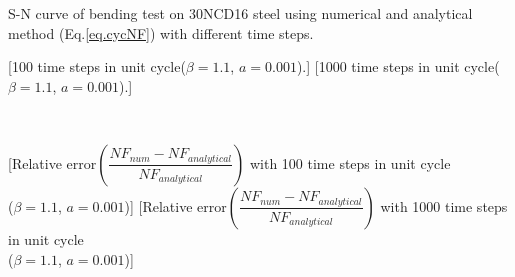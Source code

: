 \documentclass[3p,times,number,review]{elsarticle}
\begin{document}
\begin{Figure}[]{S-N curve of bending test on 30NCD16 steel using numerical and analytical method (Eq.\eqref{eq.cycNF}) with different time steps.}
	\centerline{
		[100 time steps in unit cycle($\beta=1.1$, $a=0.001$).]
		[1000 time steps in unit cycle($\beta=1.1$, $a=0.001$).]}
	\\
	\centerline{
		[Relative error$\left( \dfrac{NF_{num}-NF_{analytical}}{NF_{analytical}}\right)$  with 100 time steps in unit cycle\\  ($\beta=1.1$, $a=0.001$)]
		[Relative error$\left( \dfrac{NF_{num}-NF_{analytical}}{NF_{analytical}}\right)$  with 1000 time steps in unit cycle \\ ($\beta=1.1$, $a=0.001$)]}
	\label{fig.sn-num-ana}
\end{Figure}
%
\end{document}
